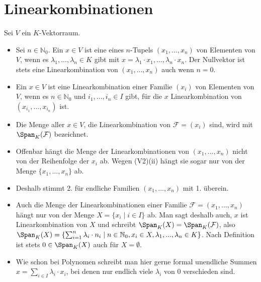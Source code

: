 \section{Linearkombinationen}

Sei $V$ ein $K$-Vektorraum.

\begin{definition}[Linearkombination]
	\begin{itemize}
		\item Sei $n \in \mathbb N_0$. Ein $x \in V$ ist eine  eines $n$-Tupels $(x_1,...,x_n)$ von Elementen von $V$, wenn es $\lambda_1,...,\lambda_n \in K$ gibt mit $x=\lambda_1\cdot x_1,...,\lambda_n \cdot x_n$. Der Nullvektor ist stets eine Linearkombination von $(x_1,...,x_n)$ auch wenn $n=0$.
		\item Ein $x\in V$ ist eine Linearkombination einer Familie $(x_i)$ von Elementen von $V$, wenn es $n \in \mathbb{N}_0$ und $i_1,...,i_n \in I$ gibt, für die $x$ Linearkombination von $(x_{i_1},...,x_{i_n})$ ist.
		\item Die Menge aller $x \in V$, die Linearkombination von $\mathcal F=(x_i)$ sind, wird mit $\Span_K(\mathcal F)$ 
		bezeichnet.
	\end{itemize}
\end{definition}

\begin{remark}
	\begin{itemize}
		\item Offenbar hängt die Menge der Linearkombinationen von $(x_1,...,x_n)$ nicht von der Reihenfolge der $x_i$ ab. 
		Wegen (V2)(ii) hängt sie sogar nur von der Menge $\{x_1,...,x_n\}$ ab.
		\item Deshalb stimmt 2. für endliche Familien $(x_1,...,x_n)$ mit 1. überein.
		\item Auch die Menge der Linearkombinationen einer Familie $\mathcal F=(x_1,...,x_n)$ hängt nur von der Menge $X=
		\{x_i \mid i \in I\}$ ab. Man sagt deshalb auch, $x$ ist Linearkombination von $X$ und schreibt $\Span_K(X)=\Span_K(
		\mathcal F)$, also $\Span_K(X)=\{\sum _{i=1}^n \lambda_i\cdot n_i \mid n \in \mathbb N_0, x_i \in X, \lambda_1,
		...,\lambda_n \in K\}$. Nach Definition ist stets $0 \in \Span_K(X)$ auch für $X=\emptyset$.
		\item Wie schon bei Polynomen schreibt man hier gerne formal unendliche Summen $x=\sum_{i \in I} \lambda_i
		\cdot x_i$, bei denen nur endlich viele $\lambda_i$ von 0 verschieden sind.
	\end{itemize}
\end{remark}

